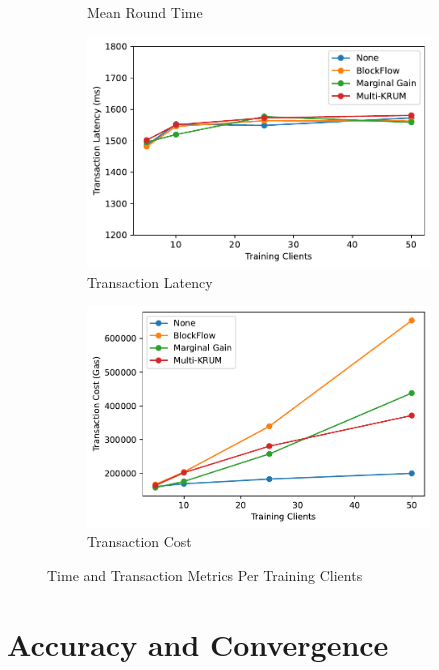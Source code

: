 \begin{figure}[!ht]
\begin{subfigure}[b]{0.49\textwidth}
        \caption{Mean Round Time}
    \end{subfigure}
    \hfill
    \begin{subfigure}[b]{0.49\textwidth}
        \centering
        \includegraphics[width=\textwidth]{graphics/clients/tx_latency.pdf}
        \caption{Transaction Latency}
    \end{subfigure}
    \hfill
    \begin{subfigure}[b]{0.49\textwidth}
        \centering
        \includegraphics[width=\textwidth]{graphics/clients/tx_cost.pdf}
        \caption{Transaction Cost}
    \end{subfigure}
    \caption{Time and Transaction Metrics Per Training Clients}
    \label{fig:clients_metrics}
\end{figure}

\section{Accuracy and Convergence}

